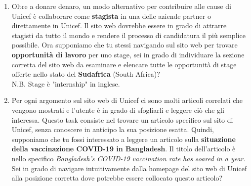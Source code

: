 \documentclass[11pt]{article}
\begin{document}
\begin{Form}
\begin{enumerate}
			\item Oltre a donare denaro, un modo alternativo per contribuire alle cause di Unicef è collaborare come \textbf{stagista} in una delle aziende partner o direttamente in Unicef. Il sito web dovrebbe essere in grado di attrarre stagisti da tutto il mondo e rendere il processo di candidatura il più semplice possibile. Ora supponiamo che tu stessi navigando sul sito web per trovare \textbf{opportunità di lavoro} per uno stage, sei in grado di individuare la sezione corretta del sito web da esaminare e elencare tutte le opportunità di stage offerte nello stato del \textbf{Sudafrica} (South Africa)?\\
			N.B. Stage è "internship" in inglese.
			
			\item Per ogni argomento sul sito web di Unicef ci sono molti articoli correlati che vengono mostrati e l'utente è in grado di sfogliarli e leggere ciò che gli interessa. Questo task consiste nel trovare un articolo specifico sul sito di Unicef, senza conoscere in anticipo la sua posizione esatta. Quindi, supponiamo che tu fossi interessato a leggere un articolo sulla \textbf{situazione della vaccinazione COVID-19 in Bangladesh}. Il titolo dell'articolo è nello specifico \textit{Bangladesh's COVID-19 vaccination rate has soared in a year}. Sei in grado di navigare intuitivamente dalla homepage del sito web di Unicef alla posizione corretta dove potrebbe essere collocato questo articolo?
			
			
		\end{enumerate}
		
		
		
	\end{Form}
	
	
	
\end{document}
